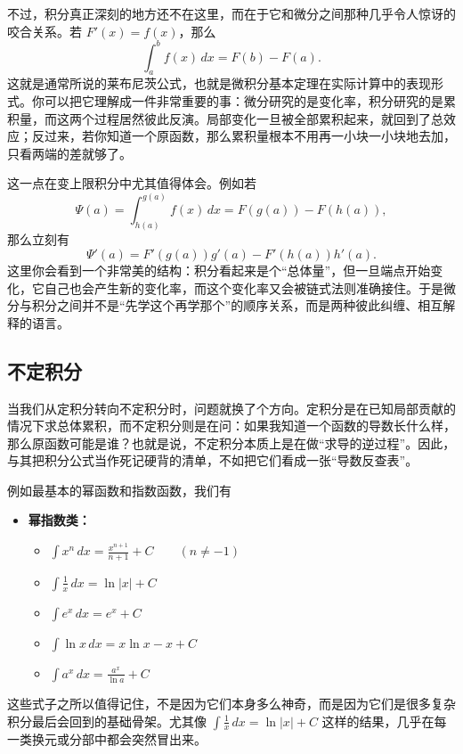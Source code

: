 \documentclass[UTF8]{ctexbook}
\begin{document}
不过，积分真正深刻的地方还不在这里，而在于它和微分之间那种几乎令人惊讶的咬合关系。若 $F'(x)=f(x)$，那么
\[
\int_a^b f(x)\,dx=F(b)-F(a).
\]
这就是通常所说的莱布尼茨公式，也就是微积分基本定理在实际计算中的表现形式。你可以把它理解成一件非常重要的事：微分研究的是变化率，积分研究的是累积量，而这两个过程居然彼此反演。局部变化一旦被全部累积起来，就回到了总效应；反过来，若你知道一个原函数，那么累积量根本不用再一小块一小块地去加，只看两端的差就够了。

这一点在变上限积分中尤其值得体会。例如若
\[
\Psi(a)=\int_{h(a)}^{g(a)}f(x)\,dx=F(g(a))-F(h(a)),
\]
那么立刻有
\[
\Psi'(a)=F'(g(a))g'(a)-F'(h(a))h'(a).
\]
这里你会看到一个非常美的结构：积分看起来是个“总体量”，但一旦端点开始变化，它自己也会产生新的变化率，而这个变化率又会被链式法则准确接住。于是微分与积分之间并不是“先学这个再学那个”的顺序关系，而是两种彼此纠缠、相互解释的语言。

\subsection{不定积分}
当我们从定积分转向不定积分时，问题就换了个方向。定积分是在已知局部贡献的情况下求总体累积，而不定积分则是在问：如果我知道一个函数的导数长什么样，那么原函数可能是谁？也就是说，不定积分本质上是在做“求导的逆过程”。因此，与其把积分公式当作死记硬背的清单，不如把它们看成一张“导数反查表”。

例如最基本的幂函数和指数函数，我们有
\begin{itemize}
  \item \textbf{幂指数类：}
  \begin{itemize}
    \item $\int x^n\,dx=\frac{x^{n+1}}{n+1}+C\qquad (n\ne -1)$
    \item $\int \frac{1}{x}\,dx=\ln|x|+C$
    \item $\int e^x\,dx=e^x+C$
    \item $\int \ln x\,dx=x\ln x-x+C$
    \item $\int a^x\,dx=\frac{a^x}{\ln a}+C$
  \end{itemize}
\end{itemize}
这些式子之所以值得记住，不是因为它们本身多么神奇，而是因为它们是很多复杂积分最后会回到的基础骨架。尤其像 $\int \frac1x\,dx=\ln|x|+C$ 这样的结果，几乎在每一类换元或分部中都会突然冒出来。
\end{document}
